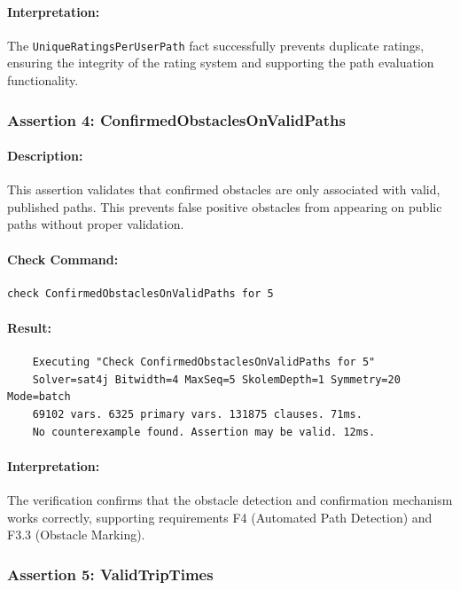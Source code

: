 \paragraph{Interpretation:} The \texttt{UniqueRatingsPerUserPath} fact successfully prevents duplicate ratings, ensuring the integrity of the rating system and supporting the path evaluation functionality.

\subsubsection{Assertion 4: ConfirmedObstaclesOnValidPaths}
\paragraph{Description:} This assertion validates that confirmed obstacles are only associated with valid, published paths. This prevents false positive obstacles from appearing on public paths without proper validation.

\paragraph{Check Command:}
\begin{verbatim}
check ConfirmedObstaclesOnValidPaths for 5
\end{verbatim}

\paragraph{Result:} 
\footnotesize
\begin{verbatim}
    Executing "Check ConfirmedObstaclesOnValidPaths for 5"
    Solver=sat4j Bitwidth=4 MaxSeq=5 SkolemDepth=1 Symmetry=20 Mode=batch
    69102 vars. 6325 primary vars. 131875 clauses. 71ms.
    No counterexample found. Assertion may be valid. 12ms.
\end{verbatim}
\normalsize

\paragraph{Interpretation:} The verification confirms that the obstacle detection and confirmation mechanism works correctly, supporting requirements F4 (Automated Path Detection) and F3.3 (Obstacle Marking).

\subsubsection{Assertion 5: ValidTripTimes}
